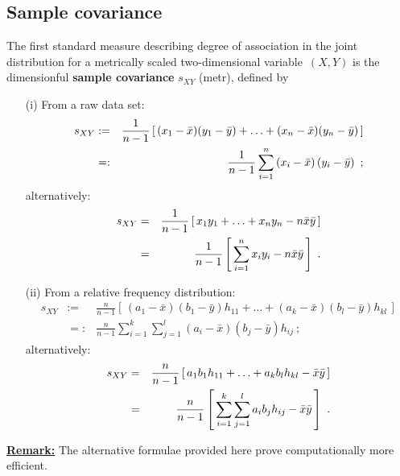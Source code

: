 \subsection[Sample covariance]{Sample covariance}
The first standard measure describing degree of association in the 
joint distribution for a metrically scaled two-dimensional 
variable~$(X,Y)$ is the dimensionful \textbf{sample covariance} 
$s_{XY}$ (metr), defined by

\begin{itemize}
\item[(i)] From a raw data set:
%
\begin{eqnarray}
\lb{eq:covar}
s_{XY}
& := & \frac{1}{n-1}\left[\,(x_{1}-\bar{x})(y_{1}-\bar{y})+\ldots
+ (x_{n}-\bar{x})(y_{n}-\bar{y})\,\right]
\nonumber \\
& =: & \frac{1}{n-1}\sum_{i=1}^{n}\left(x_{i}-\bar{x}\right)
\left(y_{i}-\bar{y}\right)
\ ;
\end{eqnarray}
%
alternatively:
%
\begin{eqnarray}
\lb{eq:covar2}
s_{XY}
& = & \frac{1}{n-1}\left[\,x_{1}y_{1}+\ldots+x_{n}y_{n}
-n\bar{x}\bar{y}\,\right] \nonumber\\
& = & \frac{1}{n-1}\left[\,\sum_{i=1}^{n}x_{i}y_{i}
-n\bar{x}\bar{y}\,\right] \ .
\end{eqnarray}
%

\item[(ii)] From a relative frequency distribution:
%
\begin{eqnarray}
s_{XY}
& := & \frac{n}{n-1}\left[\,(a_{1}-\bar{x})(b_{1}-\bar{y})h_{11}
+ \ldots + (a_{k}-\bar{x})(b_{l}-\bar{y})h_{kl}
\,\right] \nonumber\\
& =: & \frac{n}{n-1}\sum_{i=1}^{k}\sum_{j=1}^{l}
\left(a_{i}-\bar{x}\right)\left(b_{j}-\bar{y}\right)h_{ij} \ ;
\end{eqnarray}
%
alternatively:
%
\begin{eqnarray}
\lb{eq:covarrelfreq2}
s_{XY}
& = & \frac{n}{n-1}\left[\,a_{1}b_{1}h_{11}+\ldots
+a_{k}b_{l}h_{kl}-\bar{x}\bar{y}\,\right] \nonumber \\
& = & \frac{n}{n-1}\left[\,\sum_{i=1}^{k}\sum_{j=1}^{l}
a_{i}b_{j}h_{ij}-\bar{x}\bar{y}\,\right] \ .
\end{eqnarray}
%
\end{itemize}
%
\underline{\textbf{Remark:}} The alternative formulae provided here 
prove computationally more efficient.

